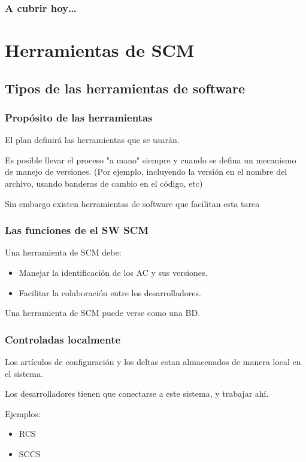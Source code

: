 
\theoremstyle{definition}
\newtheorem{definicion}{Definici\'on}

\begin{frame}
\titlepage
\end{frame}

\begin{frame}
\frametitle{A cubrir hoy\ldots}
\tableofcontents
\end{frame}

\section{Herramientas de SCM}
\subsection{Tipos de las herramientas de software}
\begin{frame}
	\frametitle{Prop\'osito de las herramientas}
	El plan definir\'a las herramientas que se usar\'an.
	
	Es posible llevar el proceso "a mano" siempre y cuando se defina un 
	mecanismo de manejo de versiones. (Por ejemplo, incluyendo la versi\'on
	en el nombre del archivo, usando banderas de cambio en el c\'odigo, etc)

	Sin embargo existen herramientas de software que facilitan esta tarea
\end{frame}
\begin{frame}
	\frametitle{Las funciones de el SW SCM}
	Una herramienta de SCM debe:
	\begin{itemize}
		\item Manejar la identificaci\'on de los AC y sus versiones.
		\item Facilitar la colaboraci\'on entre los desarrolladores.
	\end{itemize}
	Una herramienta de SCM puede verse como una BD. 
\end{frame}
\begin{frame}
	\frametitle{Controladas localmente}
	Los art\'iculos de configuraci\'on y los deltas estan almacenados de 
	manera local en el sistema. 

	Los desarrolladores tienen que conectarse a este sistema, y 
	trabajar ah\'i.

	Ejemplos: 
	\begin{itemize}
		\item RCS
		\item SCCS
	\end{itemize}
\end{frame}
